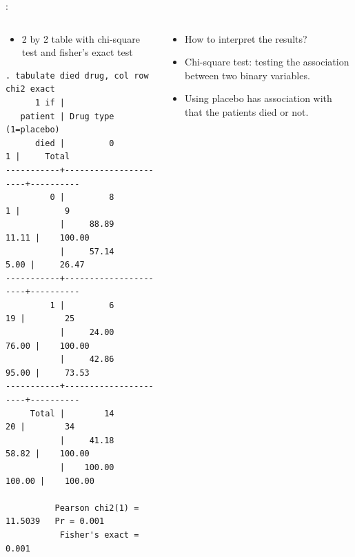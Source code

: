 \begin{frame}[fragile]{\secname: \subsecname}
\begin{columns}[t]
\begin{column}{.6\textwidth}
\begin{itemize}
\item 2 by 2 table with chi-square test and fisher's exact test
\end{itemize}
\tiny
\begin{verbatim}
. tabulate died drug, col row chi2 exact
      1 if |
   patient | Drug type (1=placebo)
      died |         0          1 |     Total
-----------+----------------------+----------
         0 |         8          1 |         9 
           |     88.89      11.11 |    100.00 
           |     57.14       5.00 |     26.47 
-----------+----------------------+----------
         1 |         6         19 |        25 
           |     24.00      76.00 |    100.00 
           |     42.86      95.00 |     73.53 
-----------+----------------------+----------
     Total |        14         20 |        34 
           |     41.18      58.82 |    100.00 
           |    100.00     100.00 |    100.00 

          Pearson chi2(1) =  11.5039   Pr = 0.001
           Fisher's exact =                 0.001
\end{verbatim}
\end{column}
\begin{column}{.4\textwidth}
\begin{itemize}
\item<2|handout:2->How to interpret the results?
\item<3|handout:3-> Chi-square test: testing the association between two binary variables.
\item<4|handout:4> Using placebo has association with that the patients died or not.
\end{itemize}

\end{column}

\end{columns}

\end{frame}

